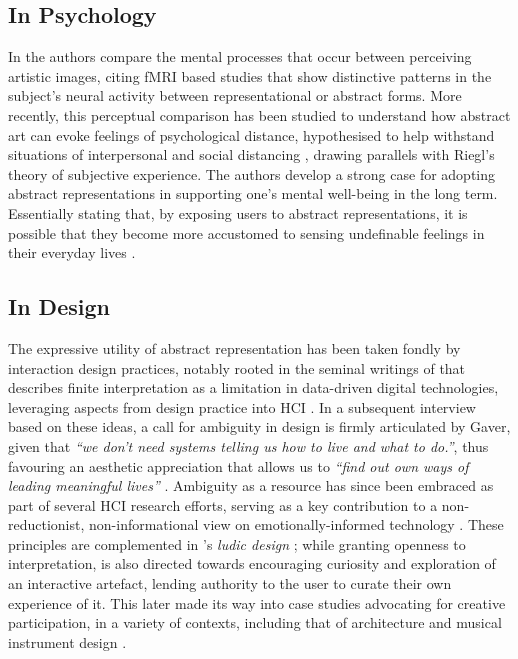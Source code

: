 \subsection*{In Psychology}

In \cite{aviv_what_2014} the authors compare the mental processes that occur between perceiving artistic images, citing fMRI based studies that show distinctive patterns in the subject's neural activity between representational or abstract forms. More recently, this perceptual comparison has been studied to understand how abstract art can evoke feelings of psychological distance, hypothesised to help withstand situations of interpersonal and social distancing \cite{durkin_objective_2020}, drawing parallels with Riegl's theory of subjective experience. The authors develop a strong case for adopting abstract representations in supporting one's mental well-being in the long term. Essentially stating that, by exposing users to abstract representations, it is possible that they become more accustomed to sensing undefinable feelings in their everyday lives \cite{durkin_objective_2020}.


\subsection*{In Design}

The expressive utility of abstract representation has been taken fondly by interaction design practices, notably rooted in the seminal writings of \citeauthor{gaver_ambiguity_2003} that describes finite interpretation as a limitation in data-driven digital technologies, leveraging aspects from design practice into HCI \cite{gaver_ambiguity_2003}. In a subsequent interview based on these ideas, a call for ambiguity in design is firmly articulated by Gaver, given that \textit{``we don’t need systems telling us how to live and what to do.''}, thus favouring an aesthetic appreciation that allows us to \textit{``find out own ways of leading meaningful lives''} \cite{gaver_gaffney_2007}. Ambiguity as a resource has since been embraced as part of several HCI research efforts, serving as a key contribution to a non-reductionist, non-informational view on emotionally-informed technology \cite{sanches_ambiguity_2019,howell_biosignals_2016,stahl_evocative_2014}. These principles are complemented in \citeauthor{gaver_drift_2004}'s \textit{ludic design} \cite{gaver_drift_2004}; while granting openness to interpretation, is also directed towards encouraging curiosity and exploration of an interactive artefact, lending authority to the user to curate their own experience of it. This later made its way into case studies advocating for creative participation, in a variety of contexts, including that of architecture and musical instrument design \cite{harriss_ludic_2010,mcpherson_designing_2016}.

